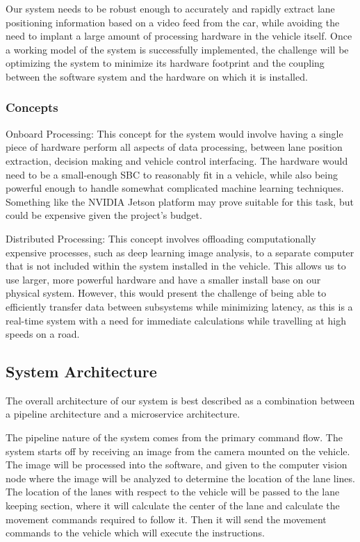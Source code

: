 \documentclass[titlepage,draft]{article}
\begin{document}
Our system needs to be robust enough to accurately and rapidly extract lane positioning information based on a video feed from the car, while avoiding the need to implant a large amount of processing hardware in the vehicle itself. Once a working model of the system is successfully implemented, the challenge will be optimizing the system to minimize its hardware footprint and the coupling between the software system and the hardware on which it is installed.

\subsubsection{Concepts}
Onboard Processing: This concept for the system would involve having a single piece of hardware perform all aspects of data processing, between lane position extraction, decision making and vehicle control interfacing. The hardware would need to be a small-enough SBC to reasonably fit in a vehicle, while also being powerful enough to handle somewhat complicated machine learning techniques. Something like the NVIDIA Jetson\cite{jetson_embeded_computing} platform may prove suitable for this task, but could be expensive given the project’s budget.

Distributed Processing: This concept involves offloading computationally expensive processes, such as deep learning image analysis, to a separate computer that is not included within the system installed in the vehicle. This allows us to use larger, more powerful hardware and have a smaller install base on our physical system. However, this would present the challenge of being able to efficiently transfer data between subsystems while minimizing latency, as this is a real-time system with a need for immediate calculations while travelling at high speeds on a road.


\subsection{System Architecture}
The overall architecture of our system is best described as a combination between a pipeline architecture and a microservice architecture.

The pipeline nature of the system comes from the primary command flow. The system starts off by receiving an image from the camera mounted on the vehicle. The image will be processed into the software, and given to the computer vision node where the image will be analyzed to determine the location of the lane lines. The location of the lanes with respect to the vehicle will be passed to the lane keeping section, where it will calculate the center of the lane and calculate the movement commands required to follow it. Then it will send the movement commands to the vehicle which will execute the instructions.
\end{document}
